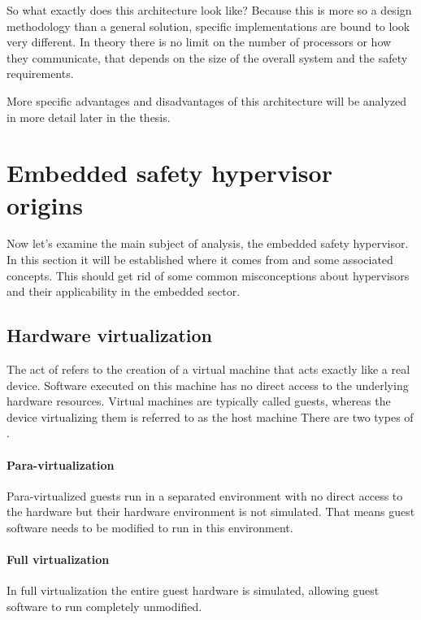 So what exactly does this architecture look like? Because this is more so a design methodology than a general solution, specific implementations are bound to look very different. In theory there is no limit on the number of processors or how they communicate, that depends on the size of the overall system and the safety requirements. 

More specific advantages and disadvantages of this architecture will be analyzed in more detail later in the thesis.


\section{Embedded safety hypervisor origins}
Now let's examine the main subject of analysis, the embedded safety hypervisor. In this section it will be established where it comes from and some associated concepts. This should get rid of some common misconceptions about hypervisors and their applicability in the embedded sector.
\subsection{Hardware virtualization} \label{hw-virt}
The act of  refers to the creation of a virtual machine  that acts exactly like a real device. Software executed on this machine has no direct access to the underlying hardware resources. Virtual machines are typically called guests, whereas the device virtualizing them is referred to as the host machine
There are two types of .
\paragraph{Para-virtualization}
Para-virtualized guests run in a separated environment with no direct access to the hardware but their hardware environment is not simulated. That means guest software needs to be modified to run in this environment.
\paragraph{Full virtualization}
In full virtualization the entire guest hardware is simulated, allowing guest software to run completely unmodified.

